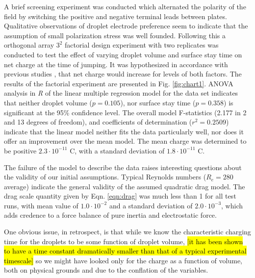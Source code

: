 \documentclass[a4paper, 12pt]{article}
\begin{document}
A brief screening experiment was conducted which alternated the polarity of the field by switching the positive and negative terminal leads between plates. Qualitative observations of droplet electrode preference seem to indicate that the assumption of small polarization stress was well founded. Following this a orthogonal array $3^2$ factorial design experiment with two replicates was conducted to test the effect of varying droplet volume and surface stay time on net charge at the time of jumping. It was hypothesized in accordance with previous studies \cite{Choi:2013dg}, that net charge would increase for levels of both factors. The results of the factorial experiment are presented in Fig. \ref{fig:chart1}. ANOVA analysis in \emph{R} of the linear multiple regression model for the data set indicates that neither droplet volume ($p=0.105$), nor surface stay time ($p=0.358$) is significant at the 95\% confidence level. The overall model F-statistics (2.177 in 2 and 13 degrees of freedom), and coefficients of determination ($r^2 = 0.2509$) indicate that the linear model neither fits the data particularly well, nor does it offer an improvement over the mean model. The mean charge was determined to be positive $2.3 \cdot 10^{-11}$ C, with a standard deviation of $1.8 \cdot 10^{-11}$ C.

The failure of the model to describe the data raises interesting questions about the validity of our initial assumptions. Typical Reynolds numbers ($R_e=280$ average) indicate the general validity of the assumed quadratic drag model. The drag scale quantity given by Eqn. \ref{eqn:drag} was much less than 1 for all test runs, with mean value of $1.0\cdot 10^{-2}$ and a standard deviation of $2.0\cdot 10^{-3}$, which adds credence to a force balance of pure inertia and electrostatic force. 

One obvious issue, in retrospect, is that while we know the characteristic charging time for the droplets to be some function of droplet volume, \hl{[it has been shown to have a time constant dramatically smaller than that of a typical experimental timescale]} so we might have looked only for the charge as a function of volume, both on physical grounds and due to the conflation of the variables.
\end{document}
